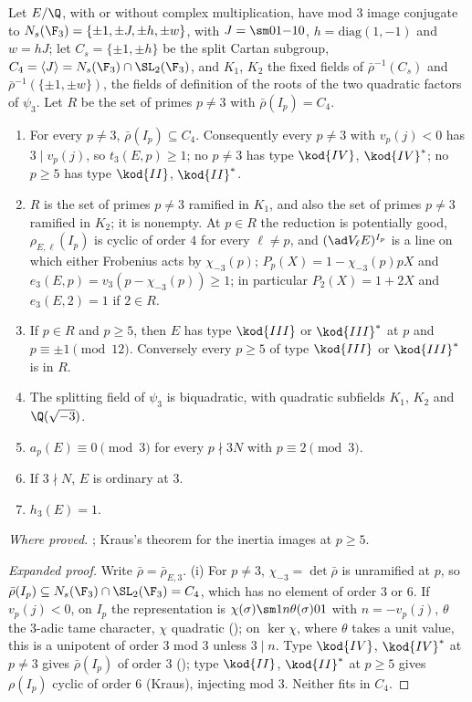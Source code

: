 \begin{sloppypar}
\begin{proposition}\label{prop:paper:ns-structure}
Let $E/\Q$, with or without complex multiplication, have mod $3$ image conjugate to $N_s(\F_3)=\{\pm1,\pm J,\pm h,\pm w\}$, with $J=\sm01{-1}0$, $h=\mathrm{diag}(1,-1)$ and $w=hJ$; let
$C_s=\{\pm1,\pm h\}$ be the split Cartan subgroup, $C_4=\langle J\rangle=N_s(\F_3)\cap\SL_2(\F_3)$, and $K_1$, $K_2$ the fixed fields of $\bar\rho^{-1}(C_s)$ and $\bar\rho^{-1}(\{\pm1,\pm w\})$, the
fields of definition of the roots of the two quadratic factors of $\psi_3$. Let $R$ be the set of primes $p\ne3$ with $\bar\rho(I_p)=C_4$.
\begin{enumerate}[label=(\roman*)]
\item For every $p\ne3$, $\bar\rho(I_p)\subseteq C_4$. Consequently every $p\ne3$ with $v_p(j)<0$ has $3\mid v_p(j)$, so $t_3(E,p)\ge1$; no $p\ne3$ has type $\kod{IV}$, $\kod{IV}^*$; no $p\ge5$ has
type $\kod{II}$, $\kod{II}^*$.
\item $R$ is the set of primes $p\ne3$ ramified in $K_1$, and also the set of primes $p\ne3$ ramified in $K_2$; it is nonempty. At $p\in R$ the reduction is potentially good,
$\rho_{E,\ell}(I_p)$ is cyclic of order $4$ for every $\ell\ne p$, and $(\ad V_\ell E)^{I_p}$ is a line on which either Frobenius acts by $\chi_{-3}(p)$; $P_p(X)=1-\chi_{-3}(p)pX$ and
$e_3(E,p)=v_3(p-\chi_{-3}(p))\ge1$; in particular $P_2(X)=1+2X$ and $e_3(E,2)=1$ if $2\in R$.
\item If $p\in R$ and $p\ge5$, then $E$ has type $\kod{III}$ or $\kod{III}^*$ at $p$ and $p\equiv\pm1\pmod{12}$. Conversely every $p\ge5$ of type $\kod{III}$ or $\kod{III}^*$ is in $R$.
\item The splitting field of $\psi_3$ is biquadratic, with quadratic subfields $K_1$, $K_2$ and $\Q(\sqrt{-3})$.
\item $a_p(E)\equiv0\pmod3$ for every $p\nmid3N$ with $p\equiv2\pmod3$.
\item If $3\nmid N$, $E$ is ordinary at $3$.
\item $h_3(E)=1$.
\end{enumerate}
\end{proposition}

\noindent\emph{Where proved.} ; Kraus's theorem \cite{Kraus90} for the inertia images at $p\ge5$.

\begin{proof}[Expanded proof]
Write $\bar\rho=\bar\rho_{E,3}$. (i) For $p\ne3$, $\chi_{-3}=\det\bar\rho$ is unramified at $p$, so $\bar\rho(I_p)\subseteq N_s(\F_3)\cap\SL_2(\F_3)=C_4$, which has no element of order $3$ or $6$. If
$v_p(j)<0$, on $I_p$ the representation is $\chi(\sigma)\sm1{n\theta(\sigma)}01$ with $n=-v_p(j)$, $\theta$ the $3$-adic tame character, $\chi$ quadratic (); on $\ker\chi$, where $\theta$
takes a unit value, this is a unipotent of order $3$ mod $3$ unless $3\mid n$. Type $\kod{IV}$, $\kod{IV}^*$ at $p\ne3$ gives $\bar\rho(I_p)$ of order $3$ (); type $\kod{II}$, $\kod{II}^*$ at
$p\ge5$ gives $\rho(I_p)$ cyclic of order $6$ (Kraus), injecting mod $3$. Neither fits in $C_4$.


\end{proof}
\end{sloppypar}
